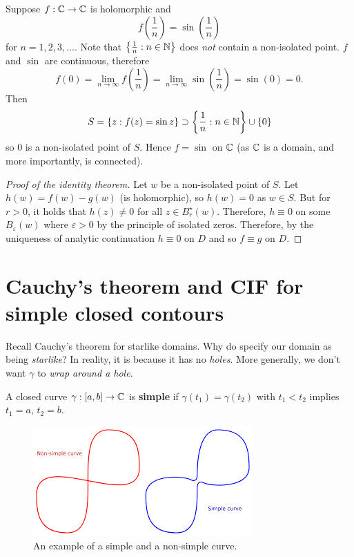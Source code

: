 \begin{example}
    Suppose $f: \mathbb{C} \to \mathbb{C}$ is holomorphic and
    \[
        f\left(\frac1n\right) = \sin\left(\frac1n\right)
    \]
    for $n = 1,2,3,\ldots$.
    Note that $\left\{\frac1n: n\in\mathbb{N}\right\}$ does \emph{not}
    contain a non-isolated point.
    $f$ and $\sin$ are continuous, therefore
    \[
        f(0) 
        = \lim_{n\to\infty} f\left(\frac1n\right)
        = \lim_{n\to\infty} \sin\left(\frac1n\right)
        = \sin(0) = 0.
    \]
    Then
    \[
        S 
        = \{ z: f(z) = \sin{z} \}
        \supset \left\{ \frac1n: n \in \mathbb{N} \right\} \cup \{0\}
    \]
    so $0$ is a non-isolated point of $S$. 
    Hence $f = \sin$ on $\mathbb{C}$
    (as $\mathbb{C}$ is a domain, and more importantly, is connected).
\end{example}

\begin{proof}[Proof of the identity theorem]
    Let $w$ be a non-isolated point of $S$.
    Let $h(w) = f(w) - g(w)$ (is holomorphic),
    so $h(w) = 0$ as $w \in S$.
    But for $r > 0$, it holds that $h(z) \neq 0$
    for all $z \in B_r^\star(w)$.
    Therefore, $h \equiv 0$
    on some $B_\varepsilon(w)$ where $\varepsilon > 0$
    by the principle of isolated zeros.
    Therefore, by the uniqueness of analytic continuation
    $h \equiv 0$ on $D$ and so $f \equiv g$ on $D$.
\end{proof}

\chapter{Cauchy's theorem and CIF for simple closed contours}

Recall Cauchy's theorem for starlike domains.
Why do specify our domain as being \emph{starlike}?
In reality, it is because it has no \emph{holes}.
More generally, we don't want $\gamma$ to \emph{wrap around a hole}.

\begin{definition}[Simple]
    A closed curve $\gamma: [a,b] \to \mathbb{C}$ is \textbf{simple}
    if $\gamma(t_1) = \gamma(t_2)$ with $t_1 < t_2$
    implies $t_1 = a$, $t_2 = b$.
\end{definition}

\begin{figure}[]
    \centering
    \includegraphics[width=0.8\linewidth]{images/simple-non-simple-closed-curve.png}
    \caption{An example of a simple and a non-simple curve.}
    \label{fig:simple-non-simple-closed-curve}
\end{figure}

